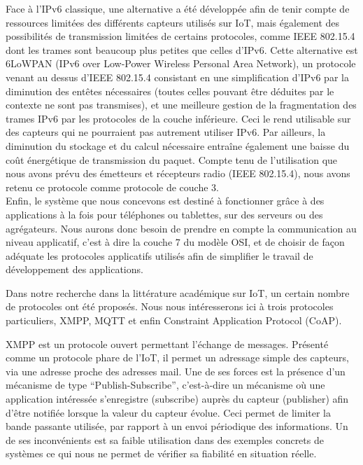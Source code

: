 \documentclass{article}
\begin{document}
Face à l’IPv6 classique, une alternative a été développée afin de tenir compte de ressources limitées des différents capteurs utilisés sur IoT, mais également des possibilités de transmission limitées de certains protocoles, comme IEEE 802.15.4 dont les trames sont beaucoup plus petites que celles d’IPv6. Cette alternative est 6LoWPAN (IPv6 over Low-Power Wireless Personal Area Network), un protocole venant au dessus d’IEEE 802.15.4 consistant en une simplification d’IPv6 par la diminution des entêtes nécessaires (toutes celles pouvant être déduites par le contexte ne sont pas transmises), et une meilleure gestion de la fragmentation des trames IPv6 par les protocoles de la couche inférieure. Ceci le rend utilisable sur des capteurs qui ne pourraient pas autrement utiliser IPv6. Par ailleurs, la diminution du stockage et du calcul nécessaire entraîne également une baisse du coût énergétique de transmission du paquet. Compte tenu de l’utilisation que nous avons prévu des émetteurs et récepteurs radio (IEEE 802.15.4), nous avons retenu ce protocole comme protocole de couche 3.
\\

Enfin, le système que nous concevons est destiné à fonctionner grâce à des applications à la fois pour téléphones ou tablettes, sur des serveurs ou des agrégateurs. Nous aurons donc besoin de prendre en compte la communication au niveau applicatif, c’est à dire la couche 7 du modèle OSI, et de choisir de façon adéquate les protocoles applicatifs utilisés afin de simplifier le travail de développement des applications.

Dans notre recherche dans la littérature académique sur IoT, un certain nombre de protocoles ont été proposés. Nous nous intéresserons ici à trois protocoles particuliers, XMPP, MQTT et enfin Constraint Application Protocol (CoAP).

XMPP est un protocole ouvert permettant l’échange de messages. Présenté comme un protocole phare de l’IoT, il permet un adressage simple des capteurs, via une adresse proche des adresses mail. Une de ses forces est la présence d’un mécanisme de type “Publish-Subscribe”, c’est-à-dire un mécanisme où une application intéressée s’enregistre (subscribe) auprès du capteur (publisher) afin d’être notifiée lorsque la valeur du capteur évolue. Ceci permet de limiter la bande passante utilisée, par rapport à un envoi périodique des informations. Un de ses inconvénients est sa faible utilisation dans des exemples concrets de systèmes ce qui nous ne permet de vérifier sa fiabilité en situation réelle.
\end{document}
